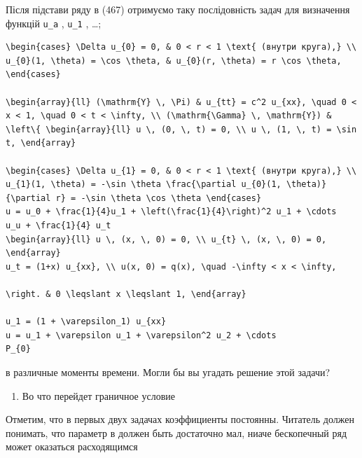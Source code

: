 \documentclass[
  ukrainian,
]{article}
\providecommand{\tightlist}{%
  \setlength{\itemsep}{0pt}\setlength{\parskip}{0pt}}
\begin{document}
Після підстави ряду в (467) отримуємо таку послідовність задач для
визначення функцій \texttt{u\_a} , \texttt{u\_1} , \ldots;

\begin{verbatim}
\begin{cases} \Delta u_{0} = 0, & 0 < r < 1 \text{ (внутри круга),} \\ u_{0}(1, \theta) = \cos \theta, & u_{0}(r, \theta) = r \cos \theta, \end{cases}

\begin{array}{ll} (\mathrm{Y} \, \Pi) & u_{tt} = c^2 u_{xx}, \quad 0 < x < 1, \quad 0 < t < \infty, \\ (\mathrm{\Gamma} \, \mathrm{Y}) & \left\{ \begin{array}{ll} u \, (0, \, t) = 0, \\ u \, (1, \, t) = \sin t, \end{array}

\begin{cases} \Delta u_{1} = 0, & 0 < r < 1 \text{ (внутри круга),} \\ u_{1}(1, \theta) = -\sin \theta \frac{\partial u_{0}(1, \theta)}{\partial r} = -\sin \theta \cos \theta \end{cases}
u = u_0 + \frac{1}{4}u_1 + \left(\frac{1}{4}\right)^2 u_1 + \cdots
u_u + \frac{1}{4} u_t
\begin{array}{ll} u \, (x, \, 0) = 0, \\ u_{t} \, (x, \, 0) = 0, \end{array}
u_t = (1+x) u_{xx}, \\ u(x, 0) = q(x), \quad -\infty < x < \infty,

\right. & 0 \leqslant x \leqslant 1, \end{array}

u_1 = (1 + \varepsilon_1) u_{xx}
u = u_1 + \varepsilon u_1 + \varepsilon^2 u_2 + \cdots
P_{0}
\end{verbatim}

в различные моменты времени. Могли бы вы угадать решение этой задачи?

\begin{enumerate}
\def\labelenumi{\arabic{enumi}.}
\setcounter{enumi}{2}
\tightlist
\item
  Во что перейдет граничное условие
\end{enumerate}

Отметим, что в первых двух задачах коэффициенты постоянны. Читатель
должен понимать, что параметр в должен быть достаточно мал, ниаче
бескопечный ряд может оказаться расходящимся
\end{document}
